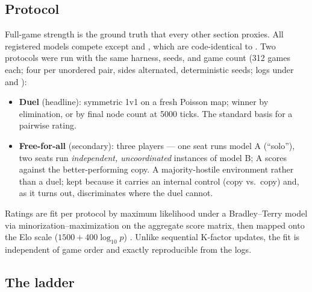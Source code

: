 
\subsection{Protocol}
\label{sec:elo-protocol}

Full-game strength is the ground truth that every other section proxies. All
registered models compete except  and , which are
code-identical to . Two protocols were run with the same harness,
seeds, and game count (312 games each; four per unordered pair, sides
alternated, deterministic seeds; logs under  and
):

\begin{itemize}
  \item \textbf{Duel} (headline): symmetric 1v1 on a fresh Poisson map;
    winner by elimination, or by final node count at 5000 ticks. The standard
    basis for a pairwise rating.
  \item \textbf{Free-for-all} (secondary): three players --- one seat runs
    model A (``solo''), two seats run \emph{independent, uncoordinated}
    instances of model B; A scores against the better-performing copy. A
    majority-hostile environment rather than a duel; kept because it carries
    an internal control (copy vs.\ copy) and, as it turns out, discriminates
    where the duel cannot.
\end{itemize}

Ratings are fit per protocol by maximum likelihood under a Bradley--Terry
model \citep{bradleyterry1952} via minorization--maximization
\citep{hunter2004} on the aggregate score matrix, then mapped onto the Elo
scale ($1500 + 400\log_{10}p$) \citep{elo1978}. Unlike sequential K-factor
updates, the fit is independent of game order and exactly reproducible from
the logs.

\subsection{The ladder}
\label{sec:elo-ladder}

\begin{table}[ht]
\centering
{}
\caption{The ladder under the duel protocol, with the free-for-all ranking
alongside (Spearman $\rho = \ffaduelspearman$ between the two). Read in
tiers: with four games per pair, small gaps are noise, and the extreme
negative values at the bottom are Bradley--Terry scale artifacts of
near-zero score rates.}
\label{tab:elo}
\end{table}

